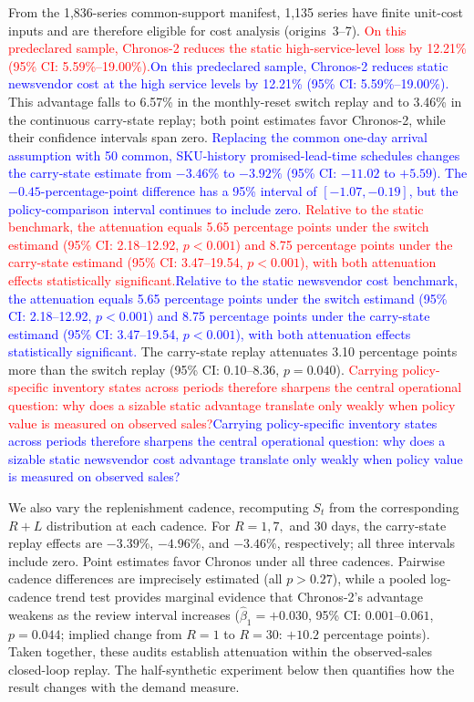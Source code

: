 \documentclass[msom,dblanonrev]{informs4}
\newcommand{\add}[1]{\textcolor{blue}{#1}}
\newcommand{\reduce}[1]{\textcolor{red}{#1}\hspace{0.5em}}
\begin{document}
From the 1{,}836-series common-support manifest, 1{,}135 series have finite unit-cost inputs and are therefore eligible for cost analysis (origins~3--7). \reduce{On this predeclared sample, Chronos-2 reduces the static high-service-level loss by 12.21\% (95\% CI: 5.59\%--19.00\%).}\add{On this predeclared sample, Chronos-2 reduces static newsvendor cost at the high service levels by 12.21\% (95\% CI: 5.59\%--19.00\%).}
This advantage falls to 6.57\% in the monthly-reset switch replay and to 3.46\% in the continuous carry-state replay; both point estimates favor Chronos-2, while their confidence intervals span zero.
\add{Replacing the common one-day arrival assumption with 50 common, SKU-history promised-lead-time schedules changes the carry-state estimate from $-3.46\%$ to $-3.92\%$ (95\% CI: $-11.02$ to $+5.59$). The $-0.45$-percentage-point difference has a 95\% interval of $[-1.07,-0.19]$, but the policy-comparison interval continues to include zero.}
\reduce{Relative to the static benchmark, the attenuation equals 5.65 percentage points under the switch estimand (95\% CI: 2.18--12.92, $p<0.001$) and 8.75 percentage points under the carry-state estimand (95\% CI: 3.47--19.54, $p<0.001$), with both attenuation effects statistically significant.}\add{Relative to the static newsvendor cost benchmark, the attenuation equals 5.65 percentage points under the switch estimand (95\% CI: 2.18--12.92, $p<0.001$) and 8.75 percentage points under the carry-state estimand (95\% CI: 3.47--19.54, $p<0.001$), with both attenuation effects statistically significant.}
The carry-state replay attenuates 3.10 percentage points more than the switch replay (95\% CI: 0.10--8.36, $p=0.040$).
\reduce{Carrying policy-specific inventory states across periods therefore sharpens the central operational question: why does a sizable static advantage translate only weakly when policy value is measured on observed sales?}\add{Carrying policy-specific inventory states across periods therefore sharpens the central operational question: why does a sizable static newsvendor cost advantage translate only weakly when policy value is measured on observed sales?}

We also vary the replenishment cadence, recomputing $S_t$ from the corresponding $R+L$ distribution at each cadence.
For $R=1,7,$ and $30$ days, the carry-state replay effects are $-3.39\%$, $-4.96\%$, and $-3.46\%$, respectively; all three intervals include zero.
Point estimates favor Chronos under all three cadences.
Pairwise cadence differences are imprecisely estimated (all $p>0.27$), while a pooled log-cadence trend test provides marginal evidence that Chronos-2's advantage weakens as the review interval increases ($\hat\beta_1=+0.030$, 95\% CI: $0.001$--$0.061$, $p=0.044$; implied change from $R=1$ to $R=30$: $+10.2$ percentage points).
Taken together, these audits establish attenuation within the observed-sales closed-loop replay.
The half-synthetic experiment below then quantifies how the result changes with the demand measure.
\end{document}
